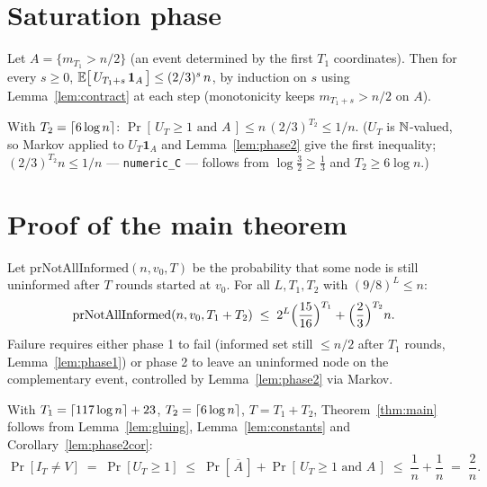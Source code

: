 \section{Saturation phase}\label{sec:saturation}

\begin{lemma}[Phase 2]\label{lem:phase2}
  \leanok
  Let $A = \{m_{T_1} > n/2\}$ (an event determined by the first $T_1$
  coordinates). Then for every $s \ge 0$,
  $\mathbb{E}\bigl[\, U_{T_1 + s}\, \mathbf{1}_A \,\bigr] \le (2/3)^{s}\, n$, by
  induction on $s$ using Lemma~\ref{lem:contract} at each step (monotonicity
  keeps $m_{T_1+s} > n/2$ on $A$).
\end{lemma}

\begin{corollary}\label{lem:phase2cor}
  \leanok
  With $T_2 = \left\lceil 6 \log n \right\rceil$: $\Pr[\, U_T \ge 1 \text{ and } A \,]
    \le n\,(2/3)^{T_2} \le 1/n$. ($U_T$ is $\mathbb{N}$-valued, so Markov applied to
  $U_T \mathbf{1}_A$ and Lemma~\ref{lem:phase2} give the first inequality;
  $(2/3)^{T_2} n \le 1/n$ — \texttt{numeric\_C} — follows from
  $\log\tfrac32 \ge \tfrac13$ and $T_2 \ge 6\log n$.)
\end{corollary}

\section{Proof of the main theorem}\label{sec:proof-main}

\begin{lemma}\label{lem:gluing}
  \leanok
  Let $\mathrm{prNotAllInformed}(n,v_0,T)$ be the probability that some node
  is still uninformed after $T$ rounds started at $v_0$. For all
  $L, T_1, T_2$ with $(9/8)^L \le n$:
  \[
    \mathrm{prNotAllInformed}(n,v_0,T_1+T_2) \;\le\;
      2^{L}\Bigl(\frac{15}{16}\Bigr)^{T_1} + \Bigl(\frac23\Bigr)^{T_2} n.
  \]
  Failure requires either phase 1 to fail (informed set still $\le n/2$
  after $T_1$ rounds, Lemma~\ref{lem:phase1}) or phase 2 to leave an
  uninformed node on the complementary event, controlled by
  Lemma~\ref{lem:phase2} via Markov.
\end{lemma}

With $T_1 = \left\lceil 117\log n \right\rceil + 23$, $T_2 = \left\lceil 6\log n \right\rceil$, $T = T_1+T_2$,
Theorem~\ref{thm:main} follows from Lemma~\ref{lem:gluing},
Lemma~\ref{lem:constants} and Corollary~\ref{lem:phase2cor}:
\[
  \Pr[I_T \ne V] \;=\; \Pr[U_T \ge 1]
  \;\le\; \Pr[\,\overline{A}\,] + \Pr[\,U_T \ge 1 \text{ and } A\,]
  \;\le\; \frac1n + \frac1n \;=\; \frac2n .
\]

